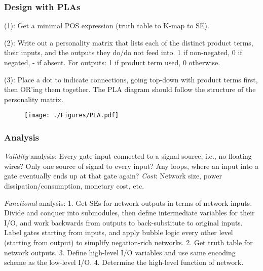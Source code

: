 \documentclass[10pt,letterpaper,twocolumn]{article}
\begin{document}
\subsubsection{Design with PLAs} 

(1): Get a minimal POS expression 
(truth table to K-map to SE). 

(2): Write out a personality matrix
that lists each of the distinct 
product terms, their inputs, and the
outputs they do/do not feed into.
1 if non-negated, 0 if negated, -
if absent. For outputs: 1 if 
product term used, 0 otherwise.

(3): Place a dot to indicate connections, 
going top-down with product terms
first, then OR'ing them together. 
The PLA diagram should follow the structure 
of the personality matrix.

\begin{figure}[H]
    \texttt{[image: ./Figures/PLA.pdf]}
\end{figure}

\begin{figure}[H]
    \begin{floatrow}
    \end{floatrow}
\end{figure}


\subsubsection{Analysis} 

\emph{Validity} analysis: 
Every gate input connected to 
a signal source, i.e., no floating wires? 
Only one source of signal to 
every input? Any loops, where an 
input into a gate eventually ends up at that
gate again? \emph{Cost}: Network size, power 
dissipation/consumption, monetary cost, etc.

\emph{Functional} analysis: 
1. Get SEs for network outputs in terms of 
network inputs. Divide and conquer
into submodules, then define intermediate variables
for their I/O, and work backwards from outputs
to back-substitute to original inputs. Label
gates starting from inputs, and apply bubble logic 
every other level (starting from output) to simplify 
negation-rich networks. 
2. Get truth table for network outputs. 
3. Define high-level I/O variables and use 
same encoding scheme as the low-level I/O. 
4. Determine the high-level function of network. 
\end{document}
